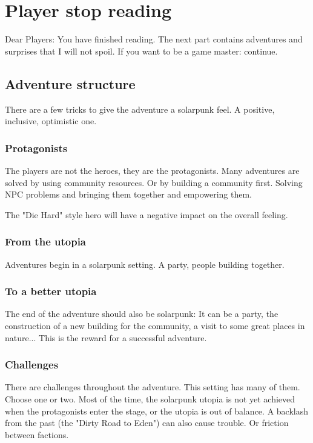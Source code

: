 \chapter{Player stop reading}

Dear Players: You have finished reading. The next part contains adventures and surprises that I will not spoil. If you want to be a game master: continue.

\section{Adventure structure}

There are a few tricks to give the adventure a solarpunk feel. A positive, inclusive, optimistic one.

\subsection{Protagonists}

The players are not the heroes, they are the protagonists. Many adventures are solved by using community resources.
Or by building a community first. Solving NPC problems and bringing them together and empowering them.

The "Die Hard" style hero will have a negative impact on the overall feeling.

\subsection{From the utopia}

Adventures begin in a solarpunk setting. A party, people building together.

\subsection{To a better utopia}

The end of the adventure should also be solarpunk: It can be a party, the construction of a new building for the community, a visit to some great places in nature... This is the reward for a successful adventure.

\subsection{Challenges}

There are challenges throughout the adventure. This setting has many of them. Choose one or two. Most of the time, the solarpunk utopia is not yet achieved when the protagonists enter the stage, or the utopia is out of balance. A backlash from the past (the "Dirty Road to Eden") can also cause trouble. Or friction between factions.

